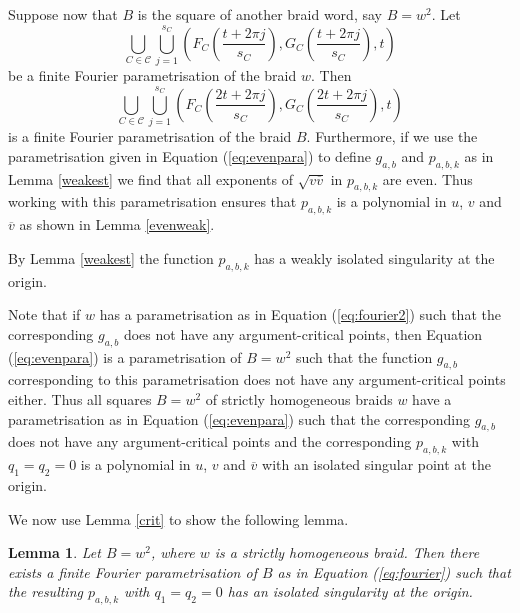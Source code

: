 \documentclass[notitlepage,12pt]{revtex4-1}
\newtheorem{lemma}[theorem]{\bf Lemma}
\begin{document}
Suppose now that $B$ is the square of another braid word, say $B=w^{2}$. Let 
\begin{equation}
\label{eq:fourier2}\bigcup_{C\in\mathcal{C}}\bigcup_{j=1}^{s_{C}}\left(F_{C}\left(\frac{t+2\pi j}{s_{C}}\right),G_{C}\left(\frac{t+2\pi j}{s_{C}}\right),t\right)
\end{equation}
be a finite Fourier parametrisation of the braid $w$. Then 
\begin{equation}
\label{eq:evenpara}
\bigcup_{C\in\mathcal{C}}\bigcup_{j=1}^{s_{C}}\left(F_{C}\left(\frac{2t+2\pi j}{s_{C}}\right),G_{C}\left(\frac{2t+2\pi j}{s_{C}}\right),t\right)
\end{equation}
is a finite Fourier parametrisation of the braid $B$. Furthermore, if we use the parametrisation given in Equation (\ref{eq:evenpara}) to define $g_{a,b}$ and $p_{a,b,k}$ as in Lemma \ref{weakest} we find that all exponents of $\sqrt{v\overline{v}}$ in $p_{a,b,k}$ are even. Thus working with this parametrisation ensures that $p_{a,b,k}$ is a polynomial in $u$, $v$ and $\overline{v}$ as shown in Lemma \ref{evenweak}.

By Lemma \ref{weakest} the function $p_{a,b,k}$ has a weakly isolated singularity at the origin. 

Note that if $w$ has a parametrisation as in Equation (\ref{eq:fourier2}) such that the corresponding $g_{a,b}$ does not have any argument-critical points, then Equation (\ref{eq:evenpara}) is a parametrisation of $B=w^2$ such that the function $g_{a,b}$ corresponding to this parametrisation does not have any argument-critical points either. Thus all squares $B=w^2$ of strictly homogeneous braids $w$ have a parametrisation as in Equation (\ref{eq:evenpara}) such that the corresponding $g_{a,b}$ does not have any argument-critical points and the corresponding $p_{a,b,k}$ with $q_{1}=q_{2}=0$ is a polynomial in $u$, $v$ and $\overline{v}$ with an isolated singular point at the origin.

We now use Lemma \ref{crit} to show the following lemma.
\begin{lemma}
\label{isolated}
Let $B=w^2$, where $w$ is a strictly homogeneous braid. Then there exists a finite Fourier parametrisation of $B$ as in Equation (\ref{eq:fourier}) such that the resulting $p_{a,b,k}$ with $q_{1}=q_{2}=0$ has an isolated singularity at the origin.
\end{lemma}
\end{document}
